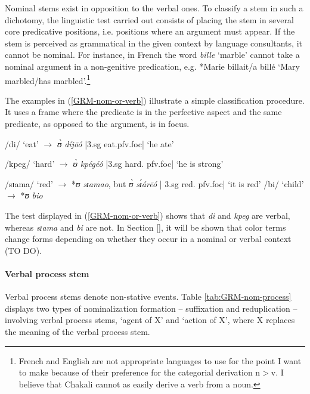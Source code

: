 \begin{exe}
\begin{exe}
\begin{exe}
{\begin{exe}
\begin{exe}
\begin{exe}
\begin{exe}
Nominal stems exist in opposition to the verbal ones. To classify a stem in such
a dichotomy, the linguistic test carried out consists of placing the stem in
several core predicative positions, i.e. positions where an
argument must appear. If the stem is perceived as grammatical in the given
context by 
language consultants, it cannot be nominal. For instance, in French the word
{\it bille}  `marble' cannot take a nominal argument in a non-genitive
predication, e.g. *Marie billait/a billé  `Mary marbled/has
marbled'.\footnote{\label{ft:GRM-fre-eng-deri}French and English are not 
appropriate languages to use
for the point I want to make  because of their preference  for the categorial
derivation n$>$v. I believe that
Chakali cannot as easily derive a verb from a noun.}


The examples in
(\ref{GRM-nom-or-verb}) illustrate a simple classification procedure. It uses a
frame where the predicate is in the 
perfective aspect and  the same 
predicate, as opposed to the argument,  is in focus.

\ea\label{GRM-nom-or-verb}
 
\ea /di/   {\rm`eat'}  $\rightarrow$ {\it ʊ̀  díjōó}  {\rm |{\sc 3.sg} 
eat.{\sc pfv.foc}| 
`he
ate'}

  \ex /kpeg/  {\rm `hard'}  $\rightarrow$ {\it ʊ̀ kpégéó} {\rm  |{\sc 3.sg} 
hard.{\sc
pfv.foc}| `he is strong'}

   \ex /sɪama/  {\rm`red'}  $\rightarrow$ *{\it ʊ sɪamao}, {\rm but}  {\it ʊ̀ 
sɪ́árēó} 
 {\rm |{\sc
3.sg} red.{\sc
pfv.foc}|  `it is
red'} 
   \ex /bi/  {\rm `child'} $\rightarrow$  *{\it ʊ bio} 
 

\z 
 \z


The test displayed in (\ref{GRM-nom-or-verb}) shows that  {\it di} and  {\it 
kpeg} are verbal,  whereas {\it sɪama} and {\it bi} are not. In
Section \ref{}, it will be shown that color terms change forms
depending on whether
they occur  in a nominal or verbal context (TO DO).  


\paragraph{Verbal process stem}
\label{sec:GRM-verb-act-stem}


Verbal process stems denote non-stative events. Table \ref{tab:GRM-nom-process} 
displays  two types of nominalization formation -- suffixation and 
reduplication -- involving verbal process stems,  `agent of X' and `action of 
X', where X replaces the meaning of the verbal process stem. 


\end{exe}
\end{exe}
\end{exe}
\end{exe}}
\end{exe}
\end{exe}
\end{exe}
